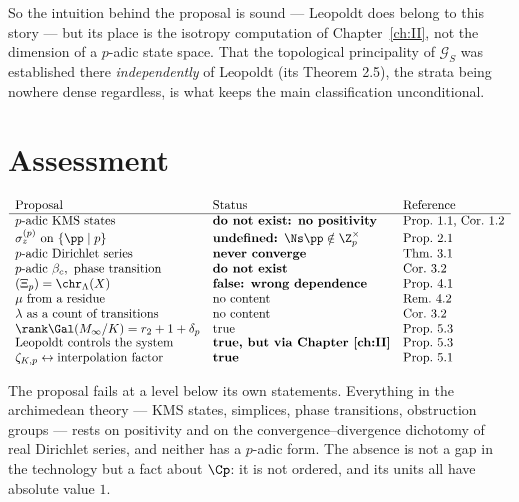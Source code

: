 \begin{remark}\label{XXII:rem:leopoldtplace}
So the intuition behind the proposal is sound --- Leopoldt does belong to this story --- but
its place is the isotropy computation of Chapter~\ref{ch:II}, not the dimension of a $p$-adic
state space. That the topological principality of $\mathcal G_S$ was established there
\emph{independently} of Leopoldt (its Theorem 2.5), the strata being nowhere dense regardless, is what keeps the
main classification unconditional.
\end{remark}

\section{Assessment}

\[
\begin{array}{lll}
\text{Proposal} & \text{Status} & \text{Reference}\\\hline
p\text{-adic KMS states} & \textbf{do not exist: no positivity} & \text{Prop.~1.1, Cor.~1.2}\\
\sigma^{(p)}_z\ \text{on}\ \{\pp\mid p\} & \textbf{undefined: }\Ns\pp\notin\Z_p^\times & \text{Prop.~2.1}\\
p\text{-adic Dirichlet series} & \textbf{never converge} & \text{Thm.~3.1}\\
p\text{-adic }\beta_c,\ \text{phase transition} & \textbf{do not exist} & \text{Cor.~3.2}\\
(\Xi_p)=\chr_\Lambda(X) & \textbf{false: wrong dependence} & \text{Prop.~4.1}\\
\mu\ \text{from a residue} & \text{no content} & \text{Rem.~4.2}\\
\lambda\ \text{as a count of transitions} & \text{no content} & \text{Cor.~3.2}\\
\rank\Gal(M_\infty/K)=r_2+1+\delta_p & \text{true} & \text{Prop.~5.3}\\[-1pt]
\text{Leopoldt controls the system} & \textbf{true, but via Chapter~\ref{ch:II}} & \text{Prop.~5.3}\\
\zeta_{K,p}\leftrightarrow\text{interpolation factor} & \textbf{true} & \text{Prop.~5.1}
\end{array}
\]

The proposal fails at a level below its own statements. Everything in the archimedean theory
--- KMS states, simplices, phase transitions, obstruction groups --- rests on positivity and
on the convergence--divergence dichotomy of real Dirichlet series, and neither has a $p$-adic
form. The absence is not a gap in the technology but a fact about $\Cp$: it is not ordered,
and its units all have absolute value $1$.

